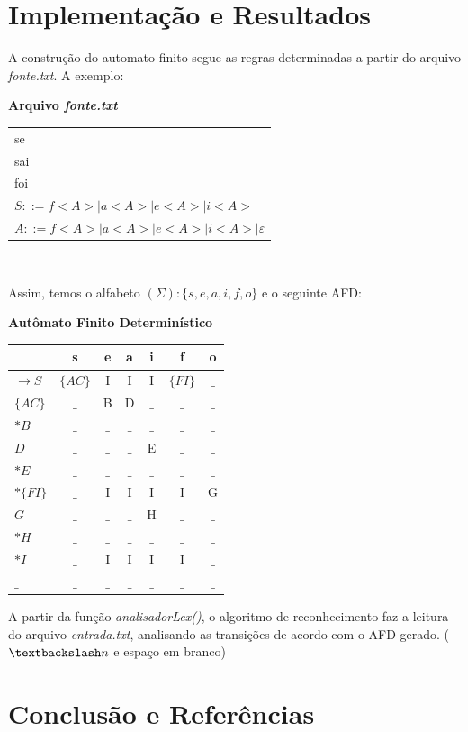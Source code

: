 \documentclass[12pt, a4paper]{article}
\begin{document}
\section{Implementação e Resultados}
	A construção do automato finito segue as regras determinadas a partir do arquivo \textit{fonte.txt}. A exemplo:\\

\begin{center}
	\textbf{Arquivo \textit{fonte.txt}}\\
\begin{tabular}{|>{\raggedright\arraybackslash}p{8.5cm}|} 
\toprule
se\\
sai\\
foi\\
$S::=f<A>|a<A>|e<A>|i<A>$\\
$A::=f<A>|a<A>|e<A>|i<A>|\varepsilon$\\
\bottomrule
\end{tabular}
\\
\end{center}

	Assim, temos o alfabeto $(\Sigma): \{s, e, a, i, f, o\}$ e o seguinte AFD:
\begin{center}
	\textbf{Autômato Finito Determinístico}\\
\begin{tabular}{|>{\raggedright\arraybackslash}p{1cm}|c|c|c|c|c|c|} 
    \toprule 
    & s & e & a & i & f & o \\
    \midrule 
    $\to S $   & $\{AC\}$ & I    & I    & I    & $\{FI\}$ & $\_$ \\
    $\{AC\}$   & $\_$     & B    & D    & $\_$ & $\_$     & $\_$ \\
    $*B$       & $\_$     & $\_$ & $\_$ & $\_$ & $\_$     & $\_$ \\
    $D$        & $\_$     & $\_$ & $\_$ & E    & $\_$     & $\_$ \\
    $*E$       & $\_$     & $\_$ & $\_$ & $\_$ & $\_$     & $\_$ \\
    $*\{FI\}$  & $\_$     & I    & I    & I    & I        & G    \\
    $G$        & $\_$     & $\_$ & $\_$ & H    & $\_$     & $\_$ \\
    $*H$       & $\_$     & $\_$ & $\_$ & $\_$ & $\_$     & $\_$ \\
    $*I$       & $\_$     & I    & I    & I    & I        & $\_$ \\
    $\_$       & $\_$     & $\_$ & $\_$ & $\_$ & $\_$     & $\_$ \\
    \bottomrule 
\end{tabular}
\end{center}

	A partir da função \textit{analisadorLex()}, o algoritmo de reconhecimento faz a leitura do arquivo \textit{entrada.txt}, analisando as transições de acordo com o AFD gerado.
	($\textbackslash n$ e espaço em branco)

\section{Conclusão e Referências}
\end{document}

